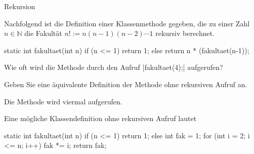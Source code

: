 \begin{exercise}{Rekursion}
\begin{body}
Nachfolgend ist die Definition einer Klassenmethode gegeben, die zu einer Zahl $n \in \mathbb{N}$ die Fakultät $n! := n (n-1) (n-2)  \dotsm 1$ rekursiv berechnet.
\medskip
\begin{displaycode}
    static int fakultaet(int n) {
        if (n <= 1) {
            return 1;
        } else {
            return n * (fakultaet(n-1));
        }
    }
\end{displaycode}
\medskip
\noindent
\begin{parts}
\item
Wie oft wird die Methode durch den Aufruf \code|fakultaet(4);| aufgerufen?

\item
Geben Sie eine äquivalente Definition der Methode ohne rekursiven Aufruf an.
\end{parts}
\end{body}

\begin{solution}
\begin{parts}
\item
Die Methode wird viermal aufgerufen.

\item
Eine mögliche Klassendefinition ohne rekursiven Aufruf lautet
\medskip
\begin{displaycode}
    static int fakultaet(int n) {   
        if (n <= 1) {
            return 1;
        } else {
            int fak = 1;
            for (int i = 2; i <= n; i++) {
                fak *= i;
            }
            return fak;
        }
    }
\end{displaycode}
\end{parts}
\end{solution}
\end{exercise}

